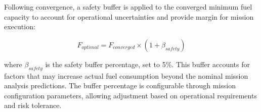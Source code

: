 Following convergence, a safety buffer is applied to the converged minimum fuel capacity to account for operational uncertainties and provide margin for mission execution:

\begin{equation}
F_{optimal} = F_{converged} \times (1 + \beta_{safety})
\end{equation}

where $\beta_{safety}$ is the safety buffer percentage,  set to 5\%. This buffer accounts for factors that may increase actual fuel consumption beyond the nominal mission analysis predictions. 
The buffer percentage is configurable through mission configuration parameters, allowing adjustment based on operational requirements and risk tolerance.
